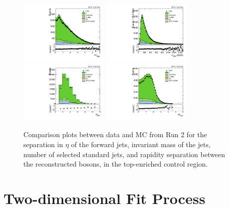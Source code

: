\begin{figure}[htbp]
  \centering
  \includegraphics[width=0.3825\textwidth]{fig/analysisAppendix/CR_b1_allL_allP_allC_allD_Run2_lnujj_vbfDEta.pdf}
  \includegraphics[width=0.3825\textwidth]{fig/analysisAppendix/CR_b1_allL_allP_allC_allD_Run2_lnujj_vbfMass.pdf}\\
  \includegraphics[width=0.3825\textwidth]{fig/analysisAppendix/CR_b1_allL_allP_allC_allD_Run2_lnujj_nJets.pdf}
  \includegraphics[width=0.3825\textwidth]{fig/analysisAppendix/CR_b1_allL_allP_allC_allD_Run2_dy.pdf}\\
  \caption{
    Comparison plots between data and MC from Run 2 for the separation in $\eta$ of the \VBF forward jets, invariant mass of the \VBF jets, number of selected standard jets, and rapidity separation between the reconstructed bosons, in the top-enriched control region.
  }
  \label{fig:CR_controlPlotsRun2_4}
\end{figure}

\section{Two-dimensional Fit Process}

